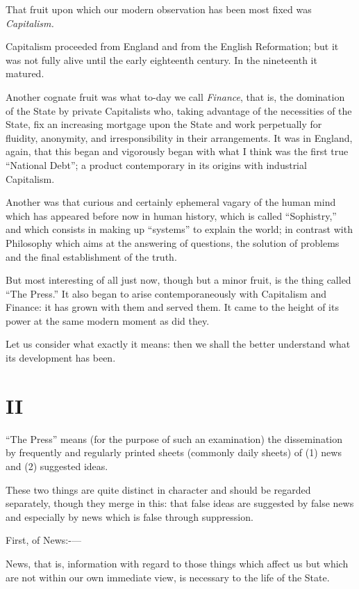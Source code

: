 \documentclass{book}
\begin{document}
That fruit upon which our modern observation has been most fixed was \emph{Capitalism.}

Capitalism proceeded from England and from the English Reformation; but it was not fully alive until the early eighteenth century. In the nineteenth it matured.

Another cognate fruit was what to-day we call \emph{Finance}, that is, the domination of the State by private Capitalists who, taking advantage of the necessities of the State, fix an increasing mortgage upon the State and work perpetually for fluidity, anonymity, and irresponsibility in their arrangements. It was in England, again, that this began and vigorously began with what I think was the first true “National Debt”; a product contemporary in its origins with industrial Capitalism.

Another was that curious and certainly ephemeral vagary of the human mind which has appeared before now in human history, which is called “Sophistry,” and which consists in making up “systems” to explain the world; in contrast with Philosophy which aims at the answering of questions, the solution of problems and the final establishment of the truth.

But most interesting of all just now, though but a minor fruit, is the thing called “The Press.” It also began to arise contemporaneously with Capitalism and Finance: it has grown with them and served them. It came to the height of its power at the same modern moment as did they.

Let us consider what exactly it means: then we shall the better understand what its development has been.

\chapter*{II}
\label{chapter-3}
“The Press” means (for the purpose of such an examination) the dissemination by frequently and regularly printed sheets (commonly daily sheets) of (1) news and (2) suggested ideas.

These two things are quite distinct in character and should be regarded separately, though they merge in this: that false ideas are suggested by false news and especially by news which is false through suppression.

First, of News:-—

News, that is, information with regard to those things which affect us but which are not within our own immediate view, is necessary to the life of the State.
\end{document}
